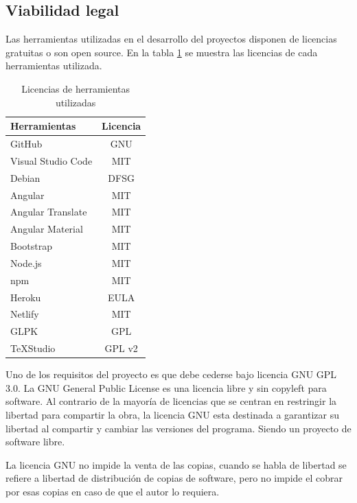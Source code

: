 \subsection{Viabilidad legal}

Las herramientas utilizadas en el desarrollo del proyectos disponen de licencias gratuitas o son open source. En la tabla \ref{fig:herramientaslicense}  se muestra las licencias de cada herramientas utilizada.

\newpage

\begin{table}[h]
    \centering
    \begin{tabular}{l c}
        \textbf{Herramientas} & \textbf{Licencia } \\ 
        \hline
        GitHub & GNU\\
        Visual Studio Code & MIT \\
        Debian & DFSG\\
        Angular & MIT\\
        Angular Translate & MIT\\
        Angular Material & MIT\\
        Bootstrap & MIT\\
        Node.js & MIT\\
        npm & MIT\\
        Heroku & EULA\\
        Netlify & MIT\\
        GLPK &  GPL\\
        \TeX{}Studio & GPL v2 \\
    \end{tabular}
    \caption{Licencias de herramientas utilizadas}
    \label{fig:herramientaslicense}
\end{table}

Uno de los requisitos del proyecto es que debe cederse bajo licencia GNU GPL 3.0. La GNU General Public License \cite{gnu:license} es una licencia libre y sin copyleft para software. Al contrario de la mayoría de licencias que se centran en restringir la libertad para compartir la obra, la licencia GNU esta destinada a garantizar su libertad al compartir y cambiar las versiones del programa. Siendo un proyecto de software libre.

La licencia GNU no impide la venta de las copias, cuando se habla de libertad se refiere a libertad de distribución de copias de software, pero no impide el cobrar por esas copias en caso de que el autor lo requiera.







